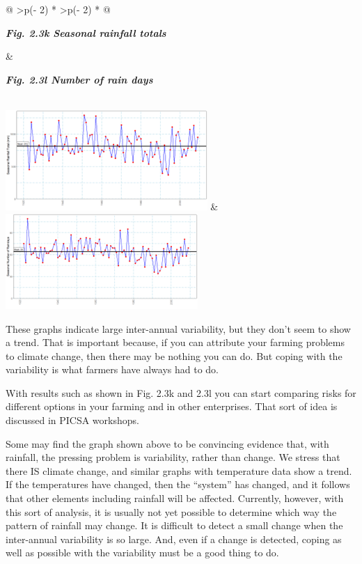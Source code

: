 \documentclass[
  letterpaper,
  DIV=11,
  numbers=noendperiod]{scrreprt}
\begin{document}
\begin{longtable}[]{@{}
  >{\centering\arraybackslash}p{(\columnwidth - 2\tabcolsep) * }
  >{\centering\arraybackslash}p{(\columnwidth - 2\tabcolsep) * }@{}}
\toprule\noalign{}
\begin{minipage}[b]{\linewidth}\centering
\textbf{\emph{Fig. 2.3k Seasonal rainfall totals}}
\end{minipage} & \begin{minipage}[b]{\linewidth}\centering
\textbf{\emph{Fig. 2.3l Number of rain days}}
\end{minipage} \\
\midrule\noalign{}
\endhead
\bottomrule\noalign{}
\endlastfoot
\includegraphics[width=3.017in,height=1.502in]{figures/Fig2.3k.png} &
\includegraphics[width=2.872in,height=1.429in]{figures/Fig2.3l.png} \\
\end{longtable}

These graphs indicate large inter-annual variability, but they don't
seem to show a trend. That is important because, if you can attribute
your farming problems to climate change, then there may be nothing you
can do. But coping with the variability is what farmers have always had
to do.

With results such as shown in Fig. 2.3k and 2.3l you can start comparing
risks for different options in your farming and in other enterprises.
That sort of idea is discussed in PICSA workshops.

Some may find the graph shown above to be convincing evidence that, with
rainfall, the pressing problem is variability, rather than change. We
stress that there IS climate change, and similar graphs with temperature
data show a trend. If the temperatures have changed, then the ``system''
has changed, and it follows that other elements including rainfall will
be affected. Currently, however, with this sort of analysis, it is
usually not yet possible to determine which way the pattern of rainfall
may change. It is difficult to detect a small change when the
inter-annual variability is so large. And, even if a change is detected,
coping as well as possible with the variability must be a good thing to
do.
\end{document}
